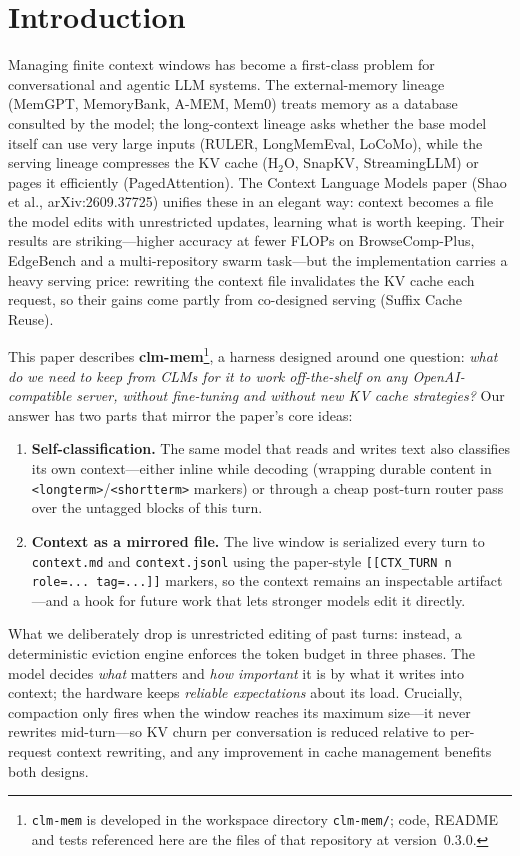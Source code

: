 \documentclass[10pt]{article}
\begin{document}
\section{Introduction}
Managing finite context windows has become a first-class problem for conversational and agentic LLM systems. The external-memory lineage (MemGPT, MemoryBank, A-MEM, Mem0) treats memory as a database consulted by the model; the long-context lineage asks whether the base model itself can use very large inputs (RULER, LongMemEval, LoCoMo), while the serving lineage compresses the KV cache (H$_2$O, SnapKV, StreamingLLM) or pages it efficiently (PagedAttention).
The Context Language Models paper (Shao et al., arXiv:2609.37725) unifies these in an elegant way: context becomes a file the model edits with unrestricted updates, learning what is worth keeping. Their results are striking---higher accuracy at fewer FLOPs on BrowseComp-Plus, EdgeBench and a multi-repository swarm task---but the implementation carries a heavy serving price: rewriting the context file invalidates the KV cache each request, so their gains come partly from co-designed serving (Suffix Cache Reuse).

This paper describes \textbf{clm-mem}\footnote{\texttt{clm-mem} is developed in the workspace directory \texttt{clm-mem/}; code, README and tests referenced here are the files of that repository at version~0.3.0.}, a harness designed around one question: \emph{what do we need to keep from CLMs for it to work off-the-shelf on any OpenAI-compatible server, without fine-tuning and without new KV cache strategies?}
Our answer has two parts that mirror the paper's core ideas:
\begin{enumerate}
\item \textbf{Self-classification.} The same model that reads and writes text also classifies its own context---either inline while decoding (wrapping durable content in \verb|<longterm>|/\verb|<shortterm>| markers) or through a cheap post-turn router pass over the untagged blocks of this turn.
\item \textbf{Context as a mirrored file.} The live window is serialized every turn to \texttt{context.md} and \texttt{context.jsonl} using the paper-style \verb|[[CTX_TURN n role=... tag=...]]| markers, so the context remains an inspectable artifact---and a hook for future work that lets stronger models edit it directly.
\end{enumerate}
What we deliberately drop is unrestricted editing of past turns: instead, a deterministic eviction engine enforces the token budget in three phases. The model decides \emph{what} matters and \emph{how important} it is by what it writes into context; the hardware keeps \emph{reliable expectations} about its load. Crucially, compaction only fires when the window reaches its maximum size---it never rewrites mid-turn---so KV churn per conversation is reduced relative to per-request context rewriting, and any improvement in cache management benefits both designs.
\end{document}
